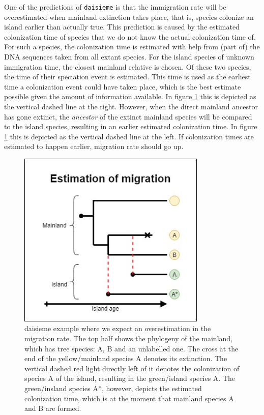 One of the predictions of \verb;daisieme; is that the immigration rate
will be overestimated when mainland extinction takes place, that is, species
colonize an island earlier than actually true. 
This prediction is caused by the estimated colonization time 
of species that we do not know the actual colonization time of.
For such a species, the colonization time is estimated with help
from (part of) the DNA sequences taken from all extant species.
For the island species of unknown immigration time, the closest mainland
relative is chosen. Of these two species, the time of their speciation
event is estimated. This time is used as the earliest time a colonization
event could have taken place, which is the best estimate possible
given the amount of information available. 
In figure \ref{fig:daisieme_example} this is depicted as the vertical
dashed line at the right. However, when the direct
mainland ancestor has gone extinct, the \emph{ancestor} of the extinct
mainland species will be compared to the island species, resulting in
an earlier estimated colonization time. 
In figure \ref{fig:daisieme_example} this is depicted as the vertical
dashed line at the left.
If colonization times are estimated to happen earlier, 
migration rate should go up.

\begin{figure}[]
  \includegraphics[width=0.8\textwidth]{daisieme_overestimation_example.jpg}
  \caption{
    daisieme example where we expect an overestimation in the migration rate.
    The top half shows the phylogeny of the mainland, which has tree
    species: A, B and an unlabelled one. The cross at the end of the
    yellow/mainland species A denotes its extinction. The vertical dashed
    red light directly left of it denotes the colonization of species A
    of the island, resulting in the green/island species A. The green/insland
    species A*, however, depicts the estimated colonization time,
    which is at the moment that mainland species A and B are formed.
  }
  \label{fig:daisieme_example}
\end{figure}

